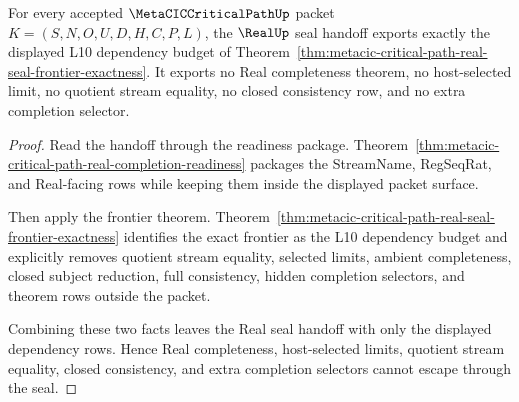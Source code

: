 \begin{theorem}
\label{thm:metacic-critical-path-real-seal-no-completeness-escape}
For every accepted $\MetaCICCriticalPathUp$ packet $K=(S,N,O,U,D,H,C,P,L)$, the $\RealUp$ seal handoff exports exactly the displayed L10 dependency budget of Theorem~\ref{thm:metacic-critical-path-real-seal-frontier-exactness}. It exports no Real completeness theorem, no host-selected limit, no quotient stream equality, no closed consistency row, and no extra completion selector.
\end{theorem}
\begin{proof}
Read the handoff through the readiness package. Theorem~\ref{thm:metacic-critical-path-real-completion-readiness} packages the StreamName, RegSeqRat, and Real-facing rows while keeping them inside the displayed packet surface.

Then apply the frontier theorem. Theorem~\ref{thm:metacic-critical-path-real-seal-frontier-exactness} identifies the exact frontier as the L10 dependency budget and explicitly removes quotient stream equality, selected limits, ambient completeness, closed subject reduction, full consistency, hidden completion selectors, and theorem rows outside the packet.

Combining these two facts leaves the Real seal handoff with only the displayed dependency rows. Hence Real completeness, host-selected limits, quotient stream equality, closed consistency, and extra completion selectors cannot escape through the seal.
\end{proof}

